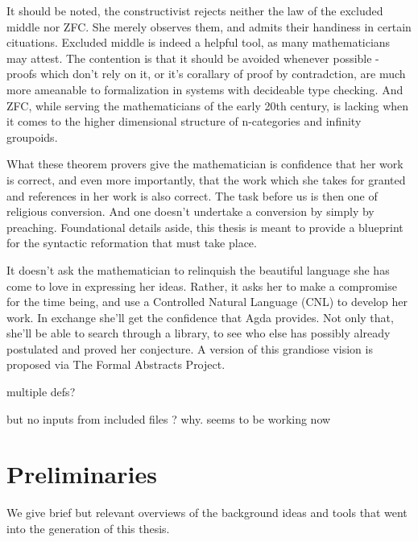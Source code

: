 \documentclass[11pt, a4paper]{article}
\begin{document}
It should be noted, the constructivist rejects neither the law of the excluded
middle nor ZFC. She merely observes them, and admits their handiness in certain
cituations. Excluded middle is indeed a helpful tool, as many mathematicians
may attest. The contention is that it should be avoided whenever possible -
proofs which don't rely on it, or it's corallary of proof by contradction, are
much more ameanable to formalization in systems with decideable type checking.
And ZFC, while serving the mathematicians of the early 20th century, is 
lacking when it comes to the higher dimensional structure of n-categories and
infinity groupoids.

What these theorem provers give the mathematician is confidence that her work
is correct, and even more importantly, that the work which she takes for
granted and references in her work is also correct. The task before us is then
one of religious conversion. And one doesn't undertake a conversion by simply
by preaching. Foundational details aside, this thesis is meant to provide a
blueprint for the syntactic reformation that must take place.  

It doesn't ask the mathematician to relinquish the beautiful language she has
come to love in expressing her ideas. Rather, it asks her to make a compromise
for the time being, and use a Controlled Natural Language (CNL) to develop her
work. In exchange she'll get the confidence that Agda provides. Not only that,
she'll be able to search through a library, to see who else has possibly already
postulated and proved her conjecture. A version of this grandiose vision is
proposed via The Formal Abstracts Project.



multiple defs?



but no inputs from included files ? why. seems to be working now



% 




\section{Preliminaries}

We give brief but relevant overviews of the background ideas and tools that went
into the generation of this thesis. 
\end{document}
